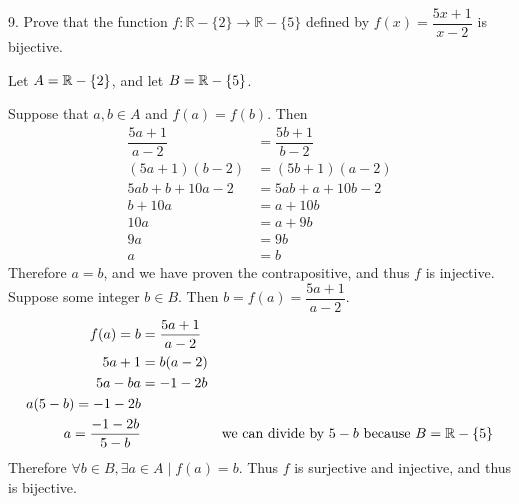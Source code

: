 \documentclass{article}
\begin{document}
\begin{exercise}{}{}
	{9. Prove that the function $f: \mathbb{R}-\{2\} \rightarrow
			\mathbb{R}-\{5\}$ defined by $f(x)=\dfrac{5 x+1}{x-2}$ is bijective.}
	\begin{alist}
		\item Let $A=\mathbb{R}-\{2\}$, and let $B=\mathbb{R}-\{5\}$.
		\item Suppose that $a, b\in A$ and $f(a)=f(b)$. Then
		\begin{align*}
			\dfrac{5 a+1}{a-2} & =\dfrac{5 b+1}{b-2} \\
			(5 a+1)(b-2)       & =(5 b+1)(a-2)       \\
			5ab+b+10a-2        & = 5ab+a+10b-2       \\
			b+10a              & = a+10b             \\
			10a                & = a+9b              \\
			9a                 & = 9b                \\
			a                  & =b
		\end{align*}
		Therefore $a=b$, and we have proven the contrapositive, and thus $f$ is injective.
		Suppose some integer $b\in B$. Then $b = f(a) = \dfrac{5a+1}{a-2}$.
		\begin{align*}
			f(a) = b             & = \dfrac{5a+1}{a-2}                                               \\
			5a+1                 & = b(a-2)                                                          \\
			5a-ba                & = -1-2b                                                           \\
			a(5-b)=-1-2b                                                                             \\
			a=\dfrac{-1-2b}{5-b} &                     & \text{we can divide by }5-b\text{ because }
			B=\mathbb{R}-\{5\}                                                                     \\
		\end{align*}
		Therefore $\forall b\in B, \exists a \in A \mid f(a)=b$.  Thus $f$ is surjective
		and injective, and thus is bijective.
	\end{alist}
\end{exercise}{}{}
\end{document}
